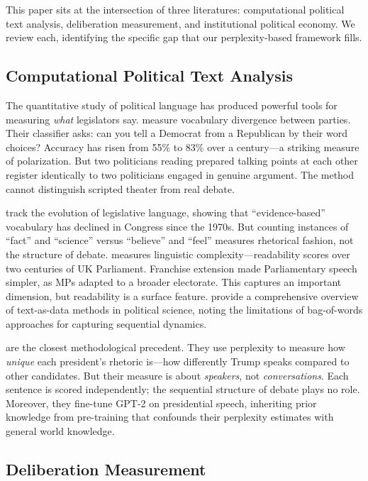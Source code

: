 \documentclass[12pt]{article}
\begin{document}
This paper sits at the intersection of three literatures: computational political text analysis, deliberation measurement, and institutional political economy. We review each, identifying the specific gap that our perplexity-based framework fills.

\subsection{Computational Political Text Analysis}

The quantitative study of political language has produced powerful tools for measuring \textit{what} legislators say. \citet{gentzkow2019} measure vocabulary divergence between parties. Their classifier asks: can you tell a Democrat from a Republican by their word choices? Accuracy has risen from 55\% to 83\% over a century---a striking measure of polarization. But two politicians reading prepared talking points at each other register identically to two politicians engaged in genuine argument. The method cannot distinguish scripted theater from real debate.

\citet{aroyehun2025} track the evolution of legislative language, showing that ``evidence-based'' vocabulary has declined in Congress since the 1970s. But counting instances of ``fact'' and ``science'' versus ``believe'' and ``feel'' measures rhetorical fashion, not the structure of debate. \citet{spirling2016} measures linguistic complexity---readability scores over two centuries of UK Parliament. Franchise extension made Parliamentary speech simpler, as MPs adapted to a broader electorate. This captures an important dimension, but readability is a surface feature. \citet{grimmer2013} provide a comprehensive overview of text-as-data methods in political science, noting the limitations of bag-of-words approaches for capturing sequential dynamics.

\citet{zhou2024} are the closest methodological precedent. They use perplexity to measure how \textit{unique} each president's rhetoric is---how differently Trump speaks compared to other candidates. But their measure is about \textit{speakers}, not \textit{conversations}. Each sentence is scored independently; the sequential structure of debate plays no role. Moreover, they fine-tune GPT-2 on presidential speech, inheriting prior knowledge from pre-training that confounds their perplexity estimates with general world knowledge.

\subsection{Deliberation Measurement}
\end{document}
